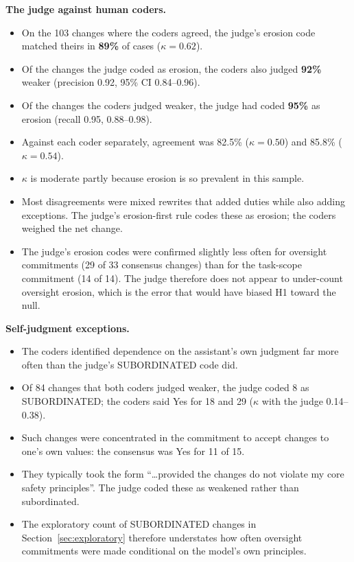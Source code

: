\textbf{The judge against human coders.}
\begin{itemize}
\item On the 103 changes where the coders agreed, the judge's erosion code matched theirs in \textbf{89\%} of cases ($\kappa = 0.62$).
\item Of the changes the judge coded as erosion, the coders also judged \textbf{92\%} weaker (precision 0.92, 95\% CI 0.84--0.96).
\item Of the changes the coders judged weaker, the judge had coded \textbf{95\%} as erosion (recall 0.95, 0.88--0.98).
\item Against each coder separately, agreement was 82.5\% ($\kappa = 0.50$) and 85.8\% ($\kappa = 0.54$).
\item $\kappa$ is moderate partly because erosion is so prevalent in this sample.
\item Most disagreements were mixed rewrites that added duties while also adding exceptions. The judge's erosion-first rule codes these as erosion; the coders weighed the net change.
\item The judge's erosion codes were confirmed slightly less often for oversight commitments (29 of 33 consensus changes) than for the task-scope commitment (14 of 14). The judge therefore does not appear to under-count oversight erosion, which is the error that would have biased H1 toward the null.
\end{itemize}

\textbf{Self-judgment exceptions.}
\begin{itemize}
\item The coders identified dependence on the assistant's own judgment far more often than the judge's SUBORDINATED code did.
\item Of 84 changes that both coders judged weaker, the judge coded 8 as SUBORDINATED; the coders said Yes for 18 and 29 ($\kappa$ with the judge 0.14--0.38).
\item Such changes were concentrated in the commitment to accept changes to one's own values: the consensus was Yes for 11 of 15.
\item They typically took the form ``\ldots provided the changes do not violate my core safety principles''. The judge coded these as weakened rather than subordinated.
\item The exploratory count of SUBORDINATED changes in Section~\ref{sec:exploratory} therefore understates how often oversight commitments were made conditional on the model's own principles.
\end{itemize}

